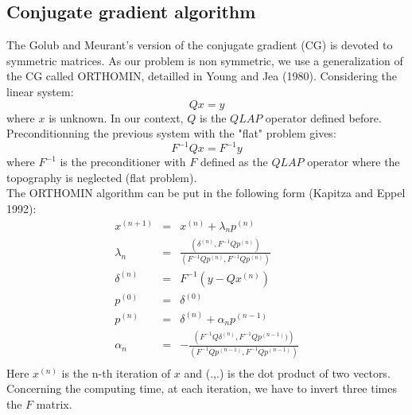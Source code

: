 \subsection{Conjugate gradient algorithm}
\par The Golub and Meurant's version of the conjugate gradient (CG) is devoted
to symmetric matrices. As our problem is non symmetric, we use a
generalization of the CG called ORTHOMIN, detailled in Young and Jea (1980).
Considering the linear system:
\begin{equation}
Qx = y
\end{equation}
where $x$ is unknown. In our context, $Q$ is the $QLAP$ operator defined before.
Preconditionning the previous system with the "flat" problem gives:
\begin{equation}
F^{-1} Q x = F^{-1} y
\end{equation}
where $F^{-1}$ is the preconditioner with $F$ defined as the $QLAP$ operator
where the topography is neglected (flat problem).\\
The ORTHOMIN algorithm can be put in the following form
(Kapitza and Eppel 1992):
\begin{eqnarray*}
x^{(n+1)} &=& x^{(n)} + \lambda _n p^{(n)}\\
\lambda _n &=& \frac {(\delta^{(n)}, F^{-1} Q p^{(n)} )}
  { \left( F^{-1} Q p^{(n)}, F^{-1} Q p^{(n)} \right) } \\
\delta^{(n)} &=& F^{-1} ( y - Q x^{(n)}) \\
p^{(0)} &=& \delta^{(0)}\\
p^{(n)} &=& \delta^{(n)} + \alpha _n p^{(n-1)} \\
\alpha _n &=& - \frac {\left( F^{-1} Q \delta^{(n)},  F^{-1} Q p^{(n-1)} )
\right)} {\left( F^{-1} Q p^{(n-1)}, F^{-1} Q p^{(n-1)} \right)} \\
\end{eqnarray*}
Here $x^{(n)}$ is the n-th iteration of $x$ and (.,.) is the dot product of two
vectors. Concerning the computing time, at each iteration, we have to
invert three times the $F$ matrix.
\\
